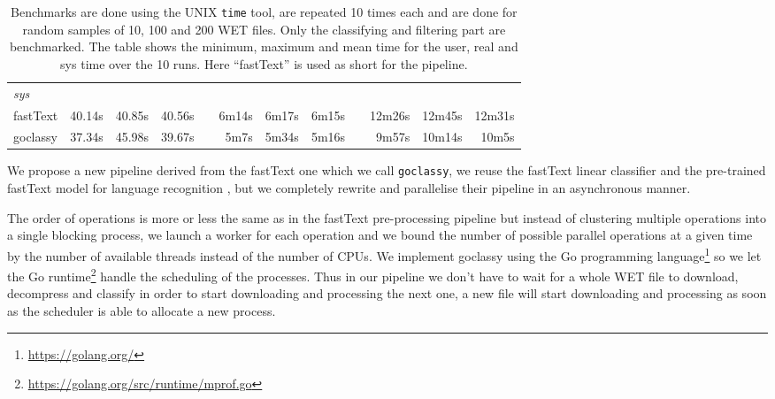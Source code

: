\begin{table*}[t!]
\begin{tabular}{lrrrcrrrcrrr}
        \emph{sys}                                                                                                                                                                                                                                                                             \\
        fastText & 40.14s                       & 40.85s                  & 40.56s                        &             & 6m14s                         & 6m17s                   & 6m15s                    &  & 12m26s                  & 12m45s                  & 12m31s                   \\
        goclassy & 37.34s                       & 45.98s                  & 39.67s                        &             & 5m7s                          & 5m34s                   & 5m16s                    &  & 9m57s                   & 10m14s                  & 10m5s                    \\
        \bottomrule
    \end{tabular}
    \caption{Benchmarks are done using the UNIX \texttt{time} tool, are repeated 10 times each and are done for random samples of 10, 100 and 200 WET files. Only the classifying and filtering part are benchmarked. The table shows the minimum, maximum and mean time for the user, real and sys time over the 10 runs. Here ``fastText'' is used as short for the pipeline.}
    \label{tab:Bench}
\end{table*}

We propose a new pipeline derived from the fastText one which we call \texttt{goclassy}, we reuse the fastText linear classifier \citep{Joulin:2016, Joulin:2017} and the pre-trained fastText model for language recognition \citep{Grave:2018}, but we completely rewrite and parallelise their pipeline in an asynchronous manner.

The order of operations is more or less the same as in the fastText pre-processing pipeline but instead of clustering multiple operations into a single blocking process, we launch a worker for each operation and we bound the number of possible parallel operations at a given time by the number of available threads instead of the number of CPUs. We implement goclassy using the Go programming language\footnote{\url{https://golang.org/}} so we let the Go runtime\footnote{\url{https://golang.org/src/runtime/mprof.go}} handle the scheduling of the processes. Thus in our pipeline we don't have to wait for a whole WET file to download, decompress and classify in order to start downloading and processing the next one, a new file will start downloading and processing as soon as the scheduler is able to allocate a new process.

